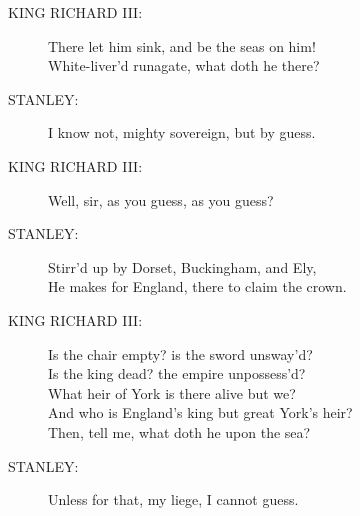 \documentclass{article}
\begin{document}
\begin{description}
\item[KING RICHARD III:] 
\hspace{1pt}There let him sink, and be the seas on him!\\
\hspace{1pt}White-liver'd runagate, what doth he there?\\
\end{description}
\begin{description}
\item[STANLEY:] 
\hspace{1pt}I know not, mighty sovereign, but by guess.\\
\end{description}
\begin{description}
\item[KING RICHARD III:] 
\hspace{1pt}Well, sir, as you guess, as you guess?\\
\end{description}
\begin{description}
\item[STANLEY:] 
\hspace{1pt}Stirr'd up by Dorset, Buckingham, and Ely,\\
\hspace{1pt}He makes for England, there to claim the crown.\\
\end{description}
\begin{description}
\item[KING RICHARD III:] 
\hspace{1pt}Is the chair empty? is the sword unsway'd?\\
\hspace{1pt}Is the king dead? the empire unpossess'd?\\
\hspace{1pt}What heir of York is there alive but we?\\
\hspace{1pt}And who is England's king but great York's heir?\\
\hspace{1pt}Then, tell me, what doth he upon the sea?\\
\end{description}
\begin{description}
\item[STANLEY:] 
\hspace{1pt}Unless for that, my liege, I cannot guess.\\
\end{description}
\end{document}
